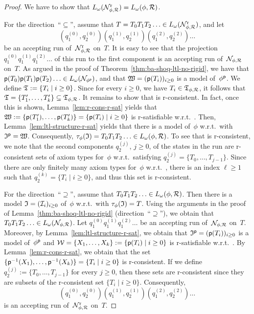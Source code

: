 \begin{proof}
    We have to show that $L_\omega(\mathcal{N}_{\phi,\mathcal{R}}^\text{r})=L_\omega(\phi,\mathcal{R})$.

    For the direction~\enquote{$\subseteq$}, assume that
    $T=T_0T_1T_2\dotso\in L_\omega(\mathcal{N}_{\phi,\mathcal{R}}^\text{r})$, and let
    \[(q_1^{(0)},q_2^{(0)})(q_1^{(1)},q_2^{(1)})(q_1^{(2)},q_2^{(2)})\dots\]
    be an accepting run of~$\mathcal{N}_{\phi,\mathcal{R}}^\text{r}$ on~$T$.
    It is easy to see that the projection $q_1^{(0)}q_1^{(1)}q_1^{(2)}\dots$ of
    this run to the first component is an accepting run of~$\mathcal{N}_{\phi,\mathcal{R}}$
    on~$T$.
    As argued in the proof of Theorem~\ref{thm:ba-shoq-ltl-no-rigid}, we have
    that $\mathsf{p}(T_0)\mathsf{p}(T_1)\mathsf{p}(T_2)\dotso\in L_\omega(\mathcal{N}_{\phi^\mathsf{p}})$, and
    that $\mathfrak{W}=(\mathsf{p}(T_i))_{i\ge 0}$ is a model of~$\phi^\mathsf{p}$.  We define
    $\mathfrak{T}:=\{T_i\mid i\ge 0\}$.  Since for every $i\ge 0$, we have
    $T_i\in\mathfrak{T}_{\phi,\mathcal{R}}$, it follows that
    $\mathfrak{T}=\{T_1',\dots,T_k'\}\subseteq\mathfrak{T}_{\phi,\mathcal{R}}$.  It remains to show
    that \Tmf is r-consistent.  In fact, once this is shown,
    Lemma~\ref{lem:r-cons-r-sat} yields that
    $\mathfrak{W}:=\{\mathsf{p}(T_1'),\dots,\mathsf{p}(T_k')\}=\{\mathsf{p}(T_i)\mid i\ge 0\}$ is
    r-satisfiable w.r.t.~\Rmc.  Then, Lemma~\ref{lem:ltl-structure-r-sat} yields
    that there is a model \Imf of~$\phi$ w.r.t.~\Rmc with $\mathfrak{I}^\mathsf{p}=\mathfrak{W}$.
    Consequently, $\tau_\phi(\mathfrak{I})=T_0T_1T_2\dotso\in L_\omega(\phi,\mathcal{R})$.
    To see that \Tmf is r-consistent, we note that the second components
    $q_2^{(j)}$, $j\ge 0$, of the states in the run are r-consistent sets of
    axiom types for~$\phi$ w.r.t.~\Rmc satisfying
    $q_2^{(j)}=\{T_0,\dots,T_{j-1}\}$.  Since there are only finitely many axiom
    types for~$\phi$ w.r.t.~\Rmc, there is an index $\ell\ge 1$ such that
    $q_2^{(k)}=\{T_i\mid i\ge 0\}$, and thus this set is r-consistent.

    For the direction~\enquote{$\supseteq$}, assume that
    $T_0T_1T_2\dotso\in L_\omega(\phi,\mathcal{R})$.  Then there is a model
    $\mathfrak{I}=(\mathcal{I}_i)_{i\ge 0}$ of~$\phi$ w.r.t.~\Rmc with $\tau_\phi(\mathfrak{I})=T$.
    Using the arguments in the proof of Lemma~\ref{thm:ba-shoq-ltl-no-rigid}
    (direction~\enquote{$\supseteq$}), we obtain that
    $T_0T_1T_2\dotso\in L_\omega(\mathcal{N}_{\phi,\mathcal{R}})$.  Let
    $q_1^{(0)}q_1^{(1)}q_1^{(2)}\dots$ be an accepting run of~$\mathcal{N}_{\phi,\mathcal{R}}$
    on~$T$.
    Moreover, by Lemma~\ref{lem:ltl-structure-r-sat}, we obtain that
    $\mathfrak{I}^\mathsf{p}=(\mathsf{p}(T_i))_{i\ge 0}$ is a model of~$\phi^\mathsf{p}$ and
    $\mathcal{W}=\{X_1,\dots,X_k\}:=\{\mathsf{p}(T_i)\mid i\ge 0\}$ is r-satisfiable
    w.r.t.~\Rmc.  By Lemma~\ref{lem:r-cons-r-sat}, we obtain that the set
    $\{\mathsf{p}^{-1}(X_1),\dots,\mathsf{p}^{-1}(X_k)\}=\{T_i\mid i\ge 0\}$ is
    r-consistent.  If we define $q_2^{(j)}:=\{T_0,\dots,T_{j-1}\}$ for every
    $j\ge 0$, then these sets are r-consistent since they are subsets of the
    r-consistent set $\{T_i\mid i\ge 0\}$.  Consequently,
    \[(q_1^{(0)},q_2^{(0)})(q_1^{(1)},q_2^{(1)})(q_1^{(2)},q_2^{(2)})\dots\]
    is an accepting run of~$\mathcal{N}_{\phi,\mathcal{R}}^\text{r}$ on~$T$.
\end{proof}

